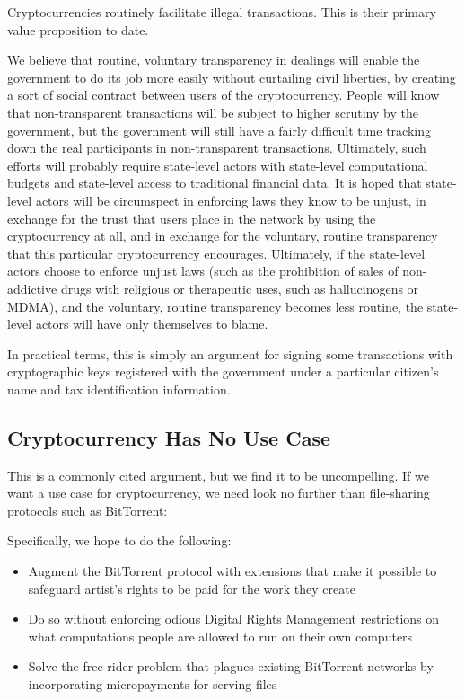 \documentclass{article}
\begin{document}
Cryptocurrencies routinely facilitate illegal transactions. This is
their primary value proposition to date. 

We believe that routine, voluntary transparency in dealings will
enable the government to do its job more easily without curtailing
civil liberties, by creating a sort of social contract between users
of the cryptocurrency. People will know that non-transparent
transactions will be subject to higher scrutiny by the government, but
the government will still have a fairly difficult time tracking down
the real participants in non-transparent transactions. Ultimately,
such efforts will probably require state-level actors with state-level
computational budgets and state-level access to traditional financial
data. It is hoped that state-level actors will be circumspect in
enforcing laws they know to be unjust, in exchange for the trust that
users place in the network by using the cryptocurrency at all, and in
exchange for the voluntary, routine transparency that this particular
cryptocurrency encourages. Ultimately, if the state-level actors
choose to enforce unjust laws (such as the prohibition of sales of
non-addictive drugs with religious or therapeutic uses, such as
hallucinogens or MDMA), and the voluntary, routine transparency
becomes less routine, the state-level actors will have only themselves
to blame.

In practical terms, this is simply an argument for signing some
transactions with cryptographic keys registered with the government
under a particular citizen's name and tax identification information.

\subsection{Cryptocurrency Has No Use Case}

This is a commonly cited argument, but we find it to be
uncompelling. If we want a use case for cryptocurrency, we need look
no further than file-sharing protocols such as BitTorrent:

Specifically, we hope to do the following:
\begin{itemize}
\item Augment the BitTorrent protocol with extensions that make it
  possible to safeguard artist's rights to be paid for the work
  they create
\item Do so without enforcing odious Digital Rights Management
  restrictions on what computations people are allowed to run on
  their own computers
\item Solve the free-rider problem that plagues existing
  BitTorrent networks by incorporating micropayments for serving
  files
\end{itemize}
\end{document}
